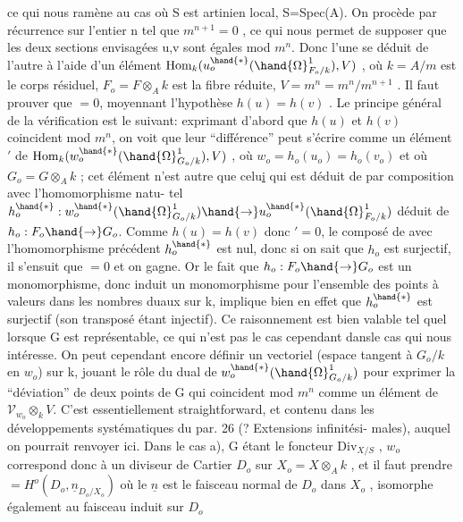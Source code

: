 
ce qui nous ramène au cas où S est artinien local, S=Spec(A). On procède
par récurrence sur l'entier n tel que $m^{n+1}=0$ , ce qui nous permet de
supposer que les deux sections envisagées u,v sont égales mod $m^{n}$. Donc
l'une se déduit de l'autre à l'aide d'un élément  
$\mathrm{Hom}_k(u_o^{\hand{*}}(\hand{\Omega}^1_{F_o/k}), V)$ , où $k=A/m$ est le corps résiduel, $F_o=F\otimes_A k$ est la
fibre réduite, $V=m^n = m^n/m^{n+1}$ . Il faut prouver que \hand{$\delta$}$= 0$, moyennant
l'hypothèse $h(u)=h(v)$ . Le principe général de la vérification est le
suivant: exprimant d'abord que $h(u)$ et $h(v)$ coincident mod $m^n$, on voit
que leur ``différence'' peut s'écrire comme un élément \hand{$\delta$}$'$ de
$\mathrm{Hom}_k(w_o^{\hand{*}}(\hand{\Omega}^1_{G_o/k}),V)$ , où $w_o = h_o(u_o)=h_o(v_o)$  et où $G_o = G\otimes_A k$ ;
cet élément n'est autre que celu\uline{i} qui est déduit de \hand{$\delta$} par composition avec l'homomorphisme natu-%
tel $h_o^{\hand{*}} : w_o^{\hand{*}}(\hand{\Omega}^1_{G_o/k}) \hand{\to} u_o^{\hand{*}}(\hand{\Omega}^1_{F_o/k})$ déduit de $h_o: F_o\hand{\to} G_o$. Comme
$h(u)=h(v)$ donc \hand{$\delta$}$' = 0$, le composé de \hand{$\delta$} avec l'homomorphisme précédent
$h_o^{\hand{*}}$ est nul, donc si on sait que $h_o$ est surjectif, il s'ensuit que \hand{$\delta$}$=0$
et on gagne. Or le fait que $h_o:F_o\hand{\to} G_o$ est un monomorphisme, donc induit
un monomorphisme pour l'ensemble des points à valeurs dans les nombres
duaux sur k, implique bien en effet que $h_o^{\hand{*}}$ est surjectif (son transposé
étant injectif). Ce raisonnement est bien valable tel quel lorsque G
est représentable, ce qui n'est pas le cas cependant dansle cas qui nous
intéresse.  On peut cependant encore définir un vectoriel  (espace tangent à $G_o/k$ en $w_o$) sur k, jouant le rôle
du dual de $w_o^{\hand{*}}(\hand{\Omega}^1_{G_o/k})$ pour exprimer la ``déviation'' de deux points de G qui
coincident mod $m^n$ comme un élément de $\mathcal{V}_{w_o}\otimes_k V$. C'est essentiellement straightforward, et contenu
dans les développements systématiques du par. 26 (? Extensions infinitési-%
males), auquel on pourrait renvoyer ici. Dans le cas a), G étant le
foncteur $\mathrm{Div}_{X/S}$ , $w_o$ correspond donc à un diviseur de Cartier  $D_o$ sur
$X_o = X\otimes_A k$ , et il faut prendre \hand{$\Omega$}$= H^o(D_o, \underline{n}_{D_o/X_o})$ où le $\underline{n}$ est le
faisceau normal de $D_o$ dans $X_o$ , isomorphe également au faisceau induit
sur $D_o$

